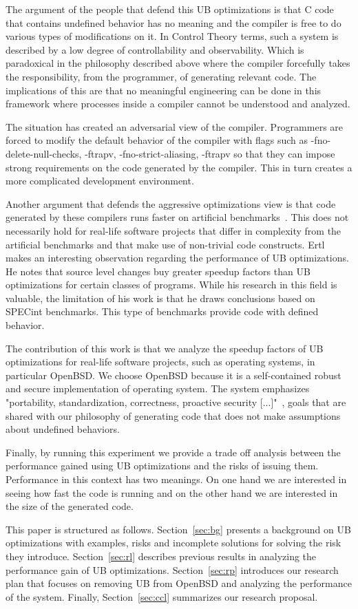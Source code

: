 The argument of the people that defend this UB optimizations is
that C code that contains undefined behavior has no meaning and the
compiler is free to do various types of modifications on it. In Control
Theory terms, such a system is described by a low degree of
controllability and observability. Which is paradoxical in the
philosophy described above where the compiler forcefully takes the
responsibility, from the programmer, of generating relevant code. The
implications of this are that no meaningful engineering can be done in
this framework where processes inside a compiler cannot be understood
and analyzed.

The situation has created an adversarial view of the compiler.
Programmers are forced to modify the default behavior of the compiler
with flags such as -fno-delete-null-checks, -ftrapv,
-fno-strict-aliasing, -ftrapv so that they can impose strong
requirements on the code generated by the compiler. This in turn creates
a more complicated development environment.

Another argument that defends the aggressive optimizations view is that
code generated by these compilers runs faster on artificial
benchmarks~\cite{gcc10benck,gcc11bench}. This does not necessarily hold
for real-life software projects that differ in complexity from the
artificial benchmarks and that make use of non-trivial code constructs.
Ertl~\cite{ertl2015every} makes an interesting observation regarding the
performance of UB optimizations. He notes that source level changes buy
greater speedup factors than UB optimizations for certain classes
of programs. While his research in this field is valuable, the
limitation of his work is that he draws conclusions based on SPECint
benchmarks. This type of benchmarks provide code with defined behavior.

The contribution of this work is that we analyze the speedup factors of
UB optimizations for real-life software projects, such as operating
systems, in particular OpenBSD. We choose OpenBSD because it is a
self-contained robust and secure implementation of operating system.
The system emphasizes "portability, standardization, correctness,
proactive security [...]"~\cite{obsdmainp}, goals that are shared with
our philosophy of generating code that does not make assumptions about
undefined behaviors.

Finally, by running this experiment we provide a trade off
analysis between the performance gained using UB optimizations and the
risks of issuing them. Performance in this context has two meanings. On
one hand we are interested in seeing how fast the code is running and on
the other hand we are interested in the size of the generated code.

This paper is structured as follows. Section~\ref{sec:bg} presents a
background on UB optimizations with examples, risks and incomplete
solutions for solving the risk they introduce. Section~\ref{sec:rl}
describes previous results in analyzing the performance gain of UB
optimizations.  Section~\ref{sec:rp} introduces our research plan that
focuses on removing UB from OpenBSD and analyzing the performance of the
system. Finally, Section~\ref{sec:ccl} summarizes our research
proposal.
